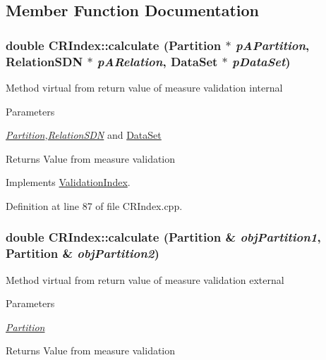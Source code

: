 \subsection{Member Function Documentation}
\hypertarget{classCRIndex_a384b9fc6a5d271c13f7b599f17771041}{
\subsubsection[{calculate}]{\setlength{\rightskip}{0pt plus 5cm}double CRIndex::calculate ({\bf Partition} $\ast$ {\em pAPartition}, \/  {\bf RelationSDN} $\ast$ {\em pARelation}, \/  {\bf DataSet} $\ast$ {\em pDataSet})}}
\label{classCRIndex_a384b9fc6a5d271c13f7b599f17771041}
Method virtual from return value of measure validation internal 
\begin{DoxyParams}{Parameters}
\item[{\em \hyperlink{classPartition}{Partition},\hyperlink{classRelationSDN}{RelationSDN}}]and \hyperlink{classDataSet}{DataSet} \end{DoxyParams}
\begin{DoxyReturn}{Returns}
Value from measure validation 
\end{DoxyReturn}


Implements \hyperlink{classValidationIndex_a26fe1244f3313bd7f557149f6846fe01}{ValidationIndex}.

Definition at line 87 of file CRIndex.cpp.\hypertarget{classCRIndex_acfcf9186a522c78d67cc977aeddaf193}{
\subsubsection[{calculate}]{\setlength{\rightskip}{0pt plus 5cm}double CRIndex::calculate ({\bf Partition} \& {\em objPartition1}, \/  {\bf Partition} \& {\em objPartition2})}}
\label{classCRIndex_acfcf9186a522c78d67cc977aeddaf193}
Method virtual from return value of measure validation external 
\begin{DoxyParams}{Parameters}
\item[{\em \hyperlink{classPartition}{Partition}}]\end{DoxyParams}
\begin{DoxyReturn}{Returns}
Value from measure validation 
\end{DoxyReturn}


